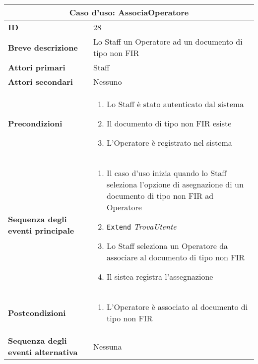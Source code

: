 \documentclass[a4paper]{report}
\begin{document}
\clearpage
\renewcommand{\arraystretch}{1.9}
\begin{table}[H]
\vspace*{-0cm}
\begin{tabular}{|p{3.9cm}|p{9.9cm}|}
\hline
\multicolumn{2}{|c|}{\textbf{Caso d’uso: AssociaOperatore}} \\ \hline
	\textbf{ID} & 28 \\ \hline
	\textbf{Breve descrizione} & Lo Staff un Operatore ad un documento di tipo non FIR \\ \hline
	\textbf{Attori primari} & Staff \\ \hline
	\textbf{Attori secondari} & Nessuno \\ \hline
	\textbf{Precondizioni} & \begin{enumerate}[leftmargin=14pt,label=\arabic*.,labelsep=0.5em,topsep=0pt,partopsep=0pt,parsep=0pt,itemsep=0pt]
        \item Lo Staff è stato autenticato dal sistema
        \item Il documento di tipo non FIR esiste
        \item L'Operatore è registrato nel sistema
    \end{enumerate} \\ \hline
	\textbf{Sequenza degli eventi principale} &
\begin{enumerate}[leftmargin=14pt,label=\arabic*.,labelsep=0.5em,topsep=0pt,partopsep=0pt,parsep=0pt,itemsep=0pt]
    \item Il caso d’uso inizia quando lo Staff seleziona l'opzione di asegnazione di un documento di tipo non FIR ad Operatore
    \item \texttt{Extend} \textit{TrovaUtente}
    \item Lo Staff seleziona un Operatore da associare al documento di tipo non FIR
    \item Il sistea registra l'assegnazione
\end{enumerate}\\ \hline
	\textbf{Postcondizioni} & \begin{enumerate}[label=\arabic*.,leftmargin=14pt,labelsep=0.5em,topsep=0pt,partopsep=0pt,parsep=0pt,itemsep=0pt]
        \item L'Operatore è associato al documento di tipo non FIR
    \end{enumerate} \\ \hline
	\textbf{Sequenza degli eventi alternativa} & Nessuna \\ \hline
\end{tabular}
\end{table}
\end{document}
